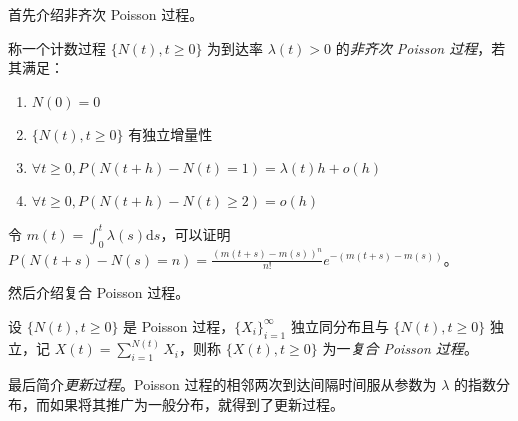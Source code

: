 \documentclass[../main.tex]{subfiles}
\begin{document}
首先介绍非齐次 Poisson 过程。

\begin{definition}\label{def:6.4.1}
    称一个计数过程 $\{N(t),t\geq0\}$ 为到达率 $\lambda(t)>0$ 的\emph{非齐次 Poisson 过程}，若其满足：
    \begin{enumerate}
        \item $N(0)=0$
        \item $\{N(t),t\geq0\}$ 有独立增量性
        \item $\forall t\geq0,P(N(t+h)-N(t)=1)=\lambda(t)h+o(h)$
        \item $\forall t\geq0,P(N(t+h)-N(t)\geq2)=o(h)$
    \end{enumerate}
\end{definition}

令 $m(t)=\int_0^t\lambda(s)\mathrm ds$，可以证明 $P(N(t+s)-N(s)=n)=\frac{(m(t+s)-m(s))^n}{n!}e^{-(m(t+s)-m(s))}$。

然后介绍复合 Poisson 过程。

\begin{definition}\label{def:6.4.2}
    设 $\{N(t),t\geq0\}$ 是 Poisson 过程，$\{X_i\}_{i=1}^\infty$ 独立同分布且与 $\{N(t),t\geq0\}$ 独立，记 $X(t)=\sum_{i=1}^{N(t)}X_i$，则称 $\{X(t),t\geq0\}$ 为一\emph{复合 Poisson 过程}。
\end{definition}

最后简介\emph{更新过程}。Poisson 过程的相邻两次到达间隔时间服从参数为 $\lambda$ 的指数分布，而如果将其推广为一般分布，就得到了更新过程。
\end{document}
